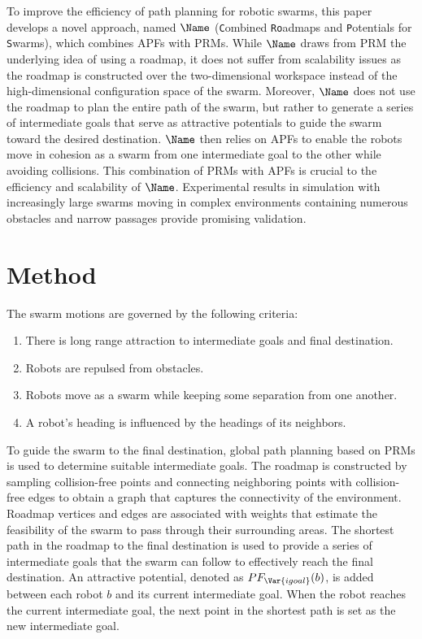 To improve the efficiency of path planning for robotic swarms, this
paper develops a novel approach, named $\Name$ (\texttt{C}ombined
\texttt{Ro}admaps and \texttt{P}otentials for \texttt{S}warms), which
combines APFs with PRMs.  While $\Name$ draws from PRM the underlying
idea of using a roadmap, it does not suffer from scalability issues as
the roadmap is constructed over the two-dimensional workspace instead
of the high-dimensional configuration space of the swarm. Moreover,
$\Name$ does not use the roadmap to plan the entire path of the swarm,
but rather to generate a series of intermediate goals that serve as
attractive potentials to guide the swarm toward the desired
destination. $\Name$ then relies on APFs to enable the robots move in
cohesion as a swarm from one intermediate goal to the other while
avoiding collisions. This combination of PRMs with APFs is crucial to
the efficiency and scalability of $\Name$. Experimental results in
simulation with increasingly large swarms moving in complex
environments containing numerous obstacles and narrow passages provide
promising validation.


\section{Method}
\label{sec:Method}

The swarm motions are governed by the following criteria:
\begin{enumerate}
\item There is long range attraction to intermediate goals and final destination. 
\item Robots are repulsed from obstacles.
\item Robots move as a swarm while keeping some separation from one another.
\item A robot's heading is influenced by the headings of its neighbors.
\end{enumerate}
To guide the swarm to the final destination, global path planning
based on PRMs is used to determine suitable
intermediate goals. The roadmap is constructed by sampling
collision-free points and connecting neighboring points with
collision-free edges to obtain a graph that captures the connectivity
of the environment. Roadmap vertices and edges are associated with
weights that estimate the feasibility of the swarm to pass through
their surrounding areas. The shortest path in the roadmap to the final
destination is used to provide a series of intermediate goals that the
swarm can follow to effectively reach the final destination. An
attractive potential, denoted as $PF_\Var{igoal}(b)$, is added between
each robot $b$ and its current intermediate goal. When the robot reaches the
current intermediate goal, the next point in the shortest path is set
as the new intermediate goal.

